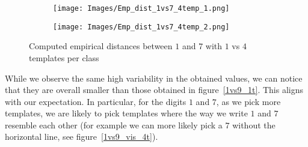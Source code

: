 \documentclass{article}
\theoremstyle{definition}
\theoremstyle{remark}
\theoremstyle{proposition}
\begin{document}
            \begin{figure}[H]
                \centering
                \begin{subfigure}{.5\textwidth}
                      \centering
                      \texttt{[image: Images/Emp\_dist\_1vs7\_4temp\_1.png]}
                \end{subfigure}%
                \begin{subfigure}{.5\textwidth}
                      \centering
                      \texttt{[image: Images/Emp\_dist\_1vs7\_4temp\_2.png]}
                \end{subfigure}
                \caption{Computed empirical distances between $1$ and $7$ with $1$ vs $4$ templates per class}
            \end{figure}

            While we observe the same high variability in the obtained values, we can notice that they are overall smaller than those obtained in figure~\ref{1vs9_1t}. This aligns with our expectation. In particular, for the digits $1$ and $7$, as we pick more templates, we are likely to pick templates where the way we write $1$ and $7$ resemble each other (for example we can more likely pick a $7$ without the horizontal line, see figure~\ref{1vs9_vis_4t}).
            
\end{document}
